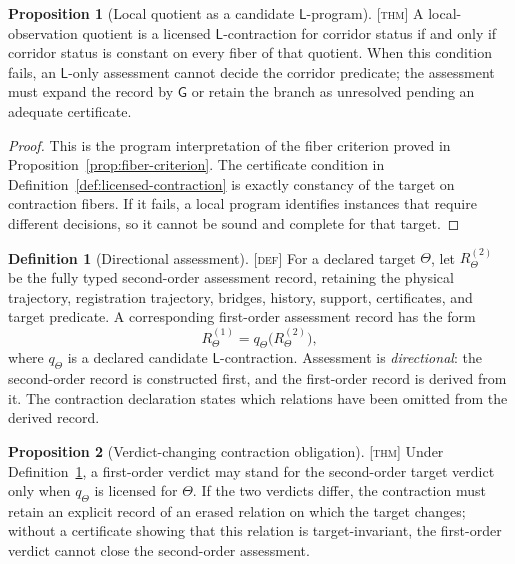 \documentclass[11pt]{article}
\newcommand{\GOp}{\ensuremath{\mathsf{G}}}
\newcommand{\LOp}{\ensuremath{\mathsf{L}}}
\newcommand{\Defn}{\textsc{[def]}}
\newcommand{\Thm}{\textsc{[thm]}}
\theoremstyle{definition}
\newtheorem{sdefinition}{Definition}
\newtheorem{sproposition}{Proposition}
\begin{document}
\begin{sproposition}[Local quotient as a candidate $\LOp$-program]
\label{prop:local-quotient-lop}
\Thm{} A local-observation quotient is a licensed $\LOp$-contraction for
corridor status if and only if corridor status is constant on every fiber of that
quotient. When this condition fails, an $\LOp$-only assessment cannot decide the
corridor predicate; the assessment must expand the record by $\GOp$ or retain the
branch as unresolved pending an adequate certificate.
\end{sproposition}

\begin{proof}
This is the program interpretation of the fiber criterion proved in
Proposition~\ref{prop:fiber-criterion}. The certificate condition in
Definition~\ref{def:licensed-contraction} is exactly constancy of the target on
contraction fibers. If it fails, a local program identifies instances that require
different decisions, so it cannot be sound and complete for that target.
\end{proof}

\begin{sdefinition}[Directional assessment]
\label{def:directional-assessment}
\Defn{} For a declared target $\Theta$, let $R^{(2)}_{\Theta}$ be the fully typed
second-order assessment record, retaining the physical trajectory, registration
trajectory, bridges, history, support, certificates, and target predicate. A
corresponding first-order assessment record has the form
\begin{equation}
R^{(1)}_{\Theta}=q_{\Theta}\bigl(R^{(2)}_{\Theta}\bigr),
\label{eq:directional-assessment}
\end{equation}
where $q_{\Theta}$ is a declared candidate $\LOp$-contraction. Assessment is
\emph{directional}: the second-order record is constructed first, and the
first-order record is derived from it. The contraction declaration states which
relations have been omitted from the derived record.
\end{sdefinition}

\begin{sproposition}[Verdict-changing contraction obligation]
\label{prop:verdict-changing-contraction}
\Thm{} Under Definition~\ref{def:directional-assessment}, a first-order verdict
may stand for the second-order target verdict only when $q_{\Theta}$ is licensed
for $\Theta$. If the two verdicts differ, the contraction must retain an explicit
record of an erased relation on which the target changes; without a certificate
showing that this relation is target-invariant, the first-order verdict cannot
close the second-order assessment.
\end{sproposition}
\end{document}
